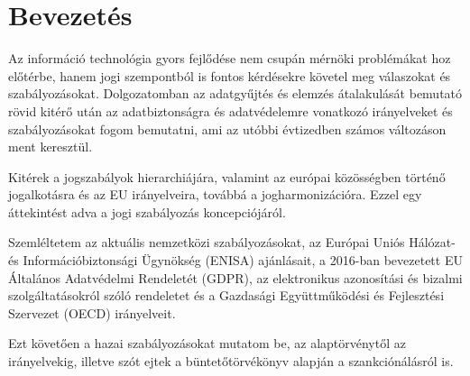 \chapter{Bevezetés}

Az információ technológia gyors fejlődése nem csupán mérnöki problémákat hoz előtérbe, hanem jogi szempontból is fontos kérdésekre követel meg válaszokat és szabályozásokat. Dolgozatomban az adatgyűjtés és elemzés átalakulását bemutató rövid kitérő után az adatbiztonságra és adatvédelemre vonatkozó irányelveket és szabályozásokat fogom bemutatni, ami az utóbbi évtizedben számos változáson ment keresztül.

Kitérek a jogszabályok hierarchiájára, valamint az európai közösségben történő jogalkotásra és az EU irányelveira, továbbá a jogharmonizációra. Ezzel egy áttekintést adva a jogi szabályozás koncepciójáról.

Szemléltetem az aktuális nemzetközi szabályozásokat, az Európai Uniós Hálózat- és Információbiztonsági Ügynökség (ENISA) ajánlásait, a 2016-ban bevezetett EU Általános Adatvédelmi Rendeletét (GDPR), az elektronikus azonosítási és bizalmi szolgáltatásokról szóló rendeletet és a Gazdasági Együttműködési és Fejlesztési Szervezet (OECD) irányelveit.

Ezt követően a hazai szabályozásokat mutatom be, az alaptörvénytől az irányelvekig, illetve szót ejtek a büntetőtörvékönyv alapján a szankciónálásról is.